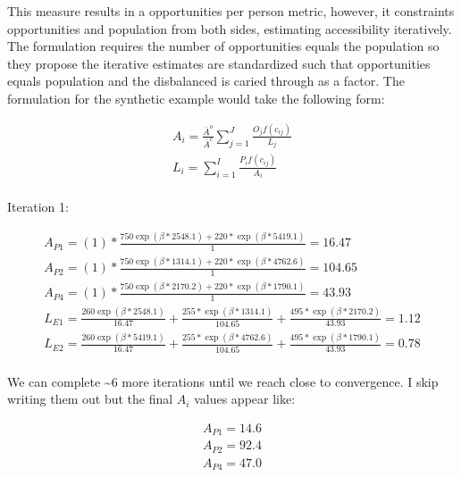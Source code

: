 \documentclass[]{elsarticle} %
\begin{document}
This measure results in a opportunities per person metric, however, it
constraints opportunities and population from both sides, estimating
accessibility iteratively. The formulation requires the number of
opportunities equals the population so they propose the iterative
estimates are standardized such that opportunities equals population and
the disbalanced is caried through as a factor. The formulation for the
synthetic example would take the following form:

\begin{equation}
\begin{array}{l}
A_{i} = \frac{\bar A^{o}}{\bar A^{c}}{\sum_{j=1}^{J} \frac{O_{j}f(c_{ij})}{L_{j}}}\\
L_{i} = {\sum_{i=1}^{I} \frac{P_{i}f(c_{ij})}{A_{i}}}\\
\end{array}
\end{equation}

Iteration 1:

\begin{equation}
\begin{array}{l}
A_{P1} = (1)*\frac{750\exp(\beta*2548.1) + 220*\exp(\beta *5419.1)}{1} = 16.47\\
A_{P2} = (1)*\frac{750\exp(\beta*1314.1) + 220*\exp(\beta *4762.6)}{1} = 104.65\\
A_{P4} = (1)*\frac{750\exp(\beta*2170.2) + 220*\exp(\beta *1790.1)}{1} = 43.93\\
L_{E1} = \frac{260\exp(\beta*2548.1)}{16.47} + \frac{255*\exp(\beta *1314.1)}{104.65} + \frac{495*\exp(\beta *2170.2)}{43.93} = 1.12\\
L_{E2} = \frac{260\exp(\beta*5419.1)}{16.47} + \frac{255*\exp(\beta *4762.6)}{104.65} + \frac{495*\exp(\beta *1790.1)}{43.93} = 0.78\\
\end{array}
\end{equation}

We can complete \textasciitilde6 more iterations until we reach close to
convergence. I skip writing them out but the final \(A_{i}\) values
appear like:

\begin{equation}
\begin{array}{l}
A_{P1} = 14.6\\
A_{P2} = 92.4\\
A_{P4} = 47.0\\
\end{array}
\end{equation}
\end{document}
